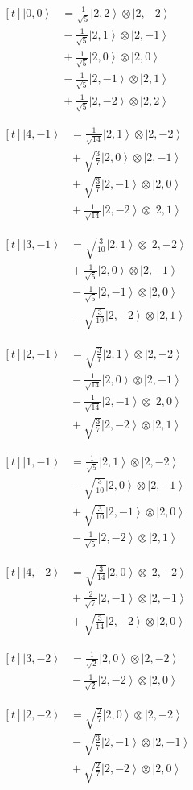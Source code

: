 \documentclass[11pt,a4paper]{article}
\newcommand{\estadocelda}[1]{%
  \begin{minipage}[t]{0.48\linewidth}
  \small\raggedright
  \(\displaystyle\begin{aligned}[t]#1\end{aligned}\)
  \end{minipage}%
}
\newcommand{\ket}[1]{\left|#1\right\rangle}
\begin{document}
\noindent\estadocelda{
\ket{0,0} &= \frac{1}{\sqrt{5}}\ket{2,2}\otimes\ket{2,-2} \\
 &{}-\frac{1}{\sqrt{5}}\ket{2,1}\otimes\ket{2,-1} \\
 &{}+\frac{1}{\sqrt{5}}\ket{2,0}\otimes\ket{2,0} \\
 &{}-\frac{1}{\sqrt{5}}\ket{2,-1}\otimes\ket{2,1} \\
 &{}+\frac{1}{\sqrt{5}}\ket{2,-2}\otimes\ket{2,2}
}\hfill\estadocelda{
\ket{4,-1} &= \frac{1}{\sqrt{14}}\ket{2,1}\otimes\ket{2,-2} \\
 &{}+\sqrt{\frac{3}{7}}\ket{2,0}\otimes\ket{2,-1} \\
 &{}+\sqrt{\frac{3}{7}}\ket{2,-1}\otimes\ket{2,0} \\
 &{}+\frac{1}{\sqrt{14}}\ket{2,-2}\otimes\ket{2,1}
}\par\addvspace{1.4em}

\noindent\estadocelda{
\ket{3,-1} &= \sqrt{\frac{3}{10}}\ket{2,1}\otimes\ket{2,-2} \\
 &{}+\frac{1}{\sqrt{5}}\ket{2,0}\otimes\ket{2,-1} \\
 &{}-\frac{1}{\sqrt{5}}\ket{2,-1}\otimes\ket{2,0} \\
 &{}-\sqrt{\frac{3}{10}}\ket{2,-2}\otimes\ket{2,1}
}\hfill\estadocelda{
\ket{2,-1} &= \sqrt{\frac{3}{7}}\ket{2,1}\otimes\ket{2,-2} \\
 &{}-\frac{1}{\sqrt{14}}\ket{2,0}\otimes\ket{2,-1} \\
 &{}-\frac{1}{\sqrt{14}}\ket{2,-1}\otimes\ket{2,0} \\
 &{}+\sqrt{\frac{3}{7}}\ket{2,-2}\otimes\ket{2,1}
}\par\addvspace{1.4em}

\noindent\estadocelda{
\ket{1,-1} &= \frac{1}{\sqrt{5}}\ket{2,1}\otimes\ket{2,-2} \\
 &{}-\sqrt{\frac{3}{10}}\ket{2,0}\otimes\ket{2,-1} \\
 &{}+\sqrt{\frac{3}{10}}\ket{2,-1}\otimes\ket{2,0} \\
 &{}-\frac{1}{\sqrt{5}}\ket{2,-2}\otimes\ket{2,1}
}\hfill\estadocelda{
\ket{4,-2} &= \sqrt{\frac{3}{14}}\ket{2,0}\otimes\ket{2,-2} \\
 &{}+\frac{2}{\sqrt{7}}\ket{2,-1}\otimes\ket{2,-1} \\
 &{}+\sqrt{\frac{3}{14}}\ket{2,-2}\otimes\ket{2,0}
}\par\addvspace{1.4em}

\noindent\estadocelda{
\ket{3,-2} &= \frac{1}{\sqrt{2}}\ket{2,0}\otimes\ket{2,-2} \\
 &{}-\frac{1}{\sqrt{2}}\ket{2,-2}\otimes\ket{2,0}
}\hfill\estadocelda{
\ket{2,-2} &= \sqrt{\frac{2}{7}}\ket{2,0}\otimes\ket{2,-2} \\
 &{}-\sqrt{\frac{3}{7}}\ket{2,-1}\otimes\ket{2,-1} \\
 &{}+\sqrt{\frac{2}{7}}\ket{2,-2}\otimes\ket{2,0}
}\par\addvspace{1.4em}
\end{document}
